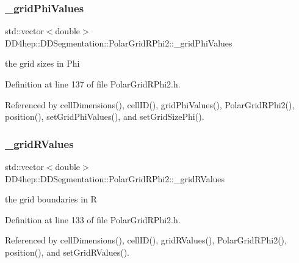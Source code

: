 \subsubsection{\texorpdfstring{\+\_\+grid\+Phi\+Values}{\_gridPhiValues}}
{\footnotesize\ttfamily std\+::vector$<$double$>$ D\+D4hep\+::\+D\+D\+Segmentation\+::\+Polar\+Grid\+R\+Phi2\+::\+\_\+grid\+Phi\+Values\hspace{0.3cm}{\ttfamily [protected]}}



the grid sizes in Phi 



Definition at line 137 of file Polar\+Grid\+R\+Phi2.\+h.



Referenced by cell\+Dimensions(), cell\+I\+D(), grid\+Phi\+Values(), Polar\+Grid\+R\+Phi2(), position(), set\+Grid\+Phi\+Values(), and set\+Grid\+Size\+Phi().

\hypertarget{class_d_d4hep_1_1_d_d_segmentation_1_1_polar_grid_r_phi2_a036c555ece1b698614ed4186f97a72d4}{}\label{class_d_d4hep_1_1_d_d_segmentation_1_1_polar_grid_r_phi2_a036c555ece1b698614ed4186f97a72d4} 
\subsubsection{\texorpdfstring{\+\_\+grid\+R\+Values}{\_gridRValues}}
{\footnotesize\ttfamily std\+::vector$<$double$>$ D\+D4hep\+::\+D\+D\+Segmentation\+::\+Polar\+Grid\+R\+Phi2\+::\+\_\+grid\+R\+Values\hspace{0.3cm}{\ttfamily [protected]}}



the grid boundaries in R 



Definition at line 133 of file Polar\+Grid\+R\+Phi2.\+h.



Referenced by cell\+Dimensions(), cell\+I\+D(), grid\+R\+Values(), Polar\+Grid\+R\+Phi2(), position(), and set\+Grid\+R\+Values().

\hypertarget{class_d_d4hep_1_1_d_d_segmentation_1_1_polar_grid_r_phi2_aab823b5b9e861ba2db50721d800d451a}{}\label{class_d_d4hep_1_1_d_d_segmentation_1_1_polar_grid_r_phi2_aab823b5b9e861ba2db50721d800d451a} 
